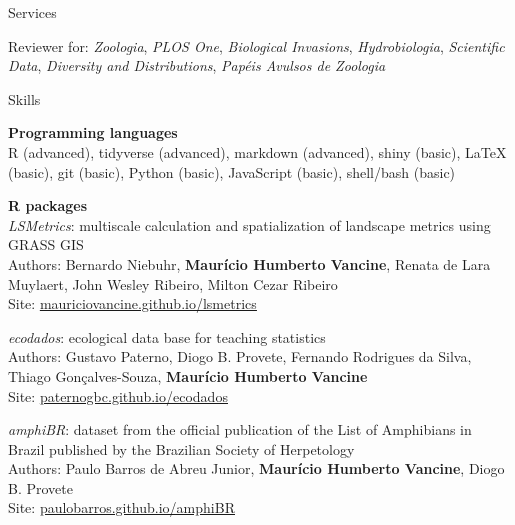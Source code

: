 \documentclass{resume}
\begin{document}

\begin{rSection}{Services}

Reviewer for: {\it Zoologia}, {\it PLOS One}, {\it Biological Invasions}, {\it Hydrobiologia}, {\it Scientific Data}, {\it Diversity and Distributions}, {\it Papéis Avulsos de Zoologia}

\end{rSection}


\begin{rSection}{Skills}

{\bf Programming languages}
\\ R (advanced), tidyverse (advanced), markdown (advanced), shiny (basic), LaTeX (basic), git (basic), Python (basic), JavaScript (basic), shell/bash (basic)

{\bf R packages}
\\ {\it LSMetrics}: multiscale calculation and spatialization of landscape metrics using GRASS GIS  
\\ Authors: Bernardo Niebuhr, {\bf Maurício Humberto Vancine}, Renata de Lara Muylaert, John Wesley Ribeiro, Milton Cezar Ribeiro
\\ Site: \href{https://mauriciovancine.github.io/lsmetrics}{\underline{mauriciovancine.github.io/lsmetrics}}

{\it ecodados}: ecological data base for teaching statistics  
\\ Authors: Gustavo Paterno, Diogo B. Provete, Fernando Rodrigues da Silva, Thiago Gonçalves-Souza, {\bf Maurício Humberto Vancine}
\\ Site: \href{https://paternogbc.github.io/ecodados/}{\underline{paternogbc.github.io/ecodados}}

{\it amphiBR}: dataset from the official publication of the List of Amphibians in Brazil published by the Brazilian Society of Herpetology
\\ Authors: Paulo Barros de Abreu Junior, {\bf Maurício Humberto Vancine}, Diogo B. Provete
\\ Site: \href{https://paulobarros.github.io/amphiBR}{\underline{paulobarros.github.io/amphiBR}}


\end{rSection}
\end{document}
